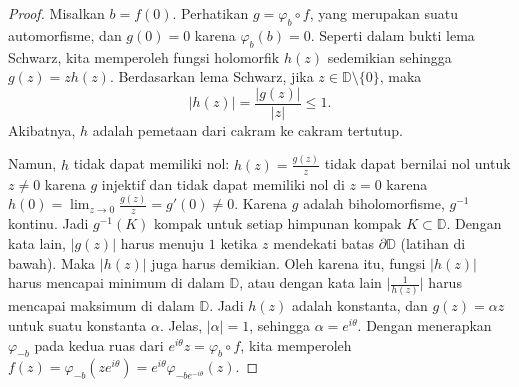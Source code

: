 \documentclass[12pt,openany]{book}
\newcommand{\sabs}[1]{\lvert {#1} \rvert}
\newcommand{\babs}[1]{\bigl\lvert {#1} \bigr\rvert}
\newcommand{\D}{{\mathbb{D}}}
\theoremstyle{plain}
\theoremstyle{remark}
\theoremstyle{definition}
\theoremstyle{exercise}
\theoremstyle{example}
\begin{document}
\begin{proof}
Misalkan $b = f(0)$.
Perhatikan $g = \varphi_b \circ f$, yang merupakan suatu automorfisme,
dan $g(0) = 0$ karena
$\varphi_b(b) = 0$.
Seperti dalam bukti lema Schwarz, kita memperoleh fungsi holomorfik $h(z)$
sedemikian sehingga $g(z) = z h(z)$.  Berdasarkan
lema Schwarz, jika $z \in \D \setminus \{ 0 \}$, maka
\begin{equation*}
\sabs{h(z)} = \frac{\sabs{g(z)}}{\sabs{z}} \leq 1 .
\end{equation*}
Akibatnya, $h$ adalah pemetaan dari cakram ke cakram tertutup.

Namun, $h$ tidak dapat memiliki nol:
$h(z) = \frac{g(z)}{z}$ tidak dapat bernilai nol untuk $z \neq 0$ karena $g$ injektif
dan tidak dapat memiliki nol di $z=0$
karena $h(0) = \lim_{z\to 0} \frac{g(z)}{z} = g'(0) \neq 0$.  Karena $g$ adalah biholomorfisme, $g^{-1}$
kontinu. Jadi $g^{-1}(K)$ kompak untuk setiap himpunan kompak $K \subset \D$.
Dengan kata lain, $\sabs{g(z)}$ harus menuju $1$ ketika $z$
mendekati batas $\partial \D$ (latihan di bawah).
Maka $\sabs{h(z)}$ juga harus demikian.
Oleh karena itu, fungsi
$\sabs{h(z)}$ harus mencapai minimum di dalam $\D$, atau dengan kata
lain $\babs{\frac{1}{h(z)}}$ harus mencapai maksimum di dalam $\D$.  Jadi $h(z)$
adalah konstanta, dan $g(z) = \alpha z$ untuk suatu konstanta $\alpha$.
Jelas, 
$\sabs{\alpha} = 1$, sehingga $\alpha = e^{i\theta}$.  Dengan menerapkan
$\varphi_{-b}$ pada kedua ruas dari $e^{i\theta} z = \varphi_b \circ f$,
kita memperoleh
$f(z) = \varphi_{-b}(ze^{i\theta})
= e^{i \theta} \varphi_{-be^{-i\theta}}(z)$.
\end{proof}
\end{document}
